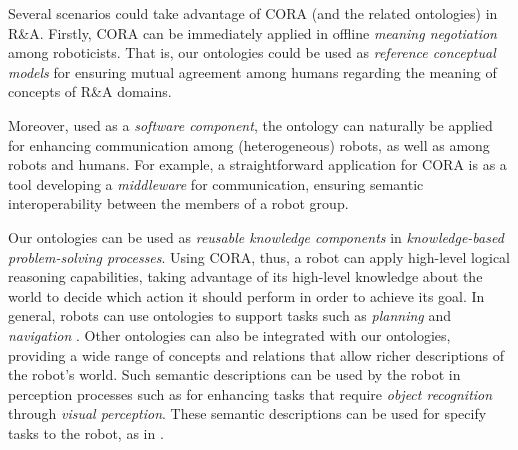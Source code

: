 \documentclass[preprint,12pt]{elsarticle}
\begin{document}
Several scenarios could take advantage of CORA (and the related ontologies) in R\&A. Firstly, CORA can be immediately applied in offline \emph{meaning negotiation} among roboticists. That is, our ontologies could be used as \emph{reference conceptual models} for ensuring mutual agreement among humans regarding the meaning of concepts of R\&A domains. 

Moreover, used as a \emph{software component}, the ontology can naturally be applied for enhancing communication among (heterogeneous) robots, as well as among robots and humans. For example, a straightforward application for CORA is as a tool developing a \emph{middleware} for communication, ensuring semantic interoperability between the members of a robot group.

Our ontologies can be used as \emph{reusable knowledge components} in \emph{knowledge-based problem-solving processes}. Using CORA, thus, a robot can apply high-level logical reasoning capabilities, taking advantage of its high-level knowledge about the world to decide which action it should perform in order to achieve its goal. In general, robots can use ontologies to support tasks such as \emph{planning} \cite{provine2004ontology,galindo2008robot,belouaer2010ontology} and \emph{navigation} \cite{bateman2005modelling}. Other ontologies can also be integrated with our ontologies, providing a wide range of concepts and relations that allow richer descriptions of the robot's world. Such semantic descriptions can be used by the robot in perception processes such as \cite{modayil2007autonomous,suh2007ontology,johnston2008ontology,lim2011ontology} for enhancing tasks that require \emph{object recognition} through \emph{visual perception}. These semantic descriptions can be used for specify tasks to the robot, as in \cite{stenmark2013knowledge}.


\end{document}
